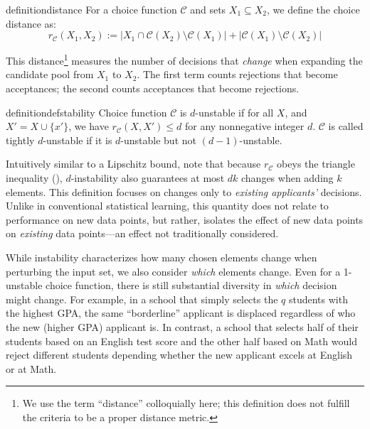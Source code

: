 \documentclass[letterpaper]{article}
\newcommand{\choice}{\mathcal{C}}
\begin{document}
\begin{restatable}{definition}{distance} \label{def:distance}
For a choice function $\choice$ and sets $X_1 \subseteq X_2$, we define the choice distance as:
\begin{equation}
r_\choice(X_1, X_2) := |X_1 \cap \choice(X_2) \setminus \choice(X_1)| + |\choice(X_1) \setminus \choice(X_2)|
\end{equation}
\end{restatable}

This distance\footnote{We use the term ``distance'' colloquially here; this definition does not fulfill the criteria to be a proper distance metric.} measures the number of decisions that \textit{change} when expanding the candidate pool from $X_1$ to $X_2$. The first term counts rejections that become acceptances; the second counts acceptances that become rejections.

\begin{restatable}[$d$-Instability]{definition}{defstability}
\label{def:d-instability}
Choice function $\choice$ is $d$-unstable if for all $X$, and $X' = X \cup \{x'\}$, we have $r_\choice(X, X') \leq d$ for any nonnegative integer $d$. $\choice$ is called tightly $d$-unstable if it is $d$-unstable but not $(d-1)$-unstable.
\end{restatable}

Intuitively similar to a Lipschitz bound, note that because $r_\choice$ obeys the triangle inequality (), $d$-instability also guarantees at most $dk$ changes when adding $k$ elements.
This definition focuses on changes only to \textit{existing applicants'} decisions. Unlike in conventional statistical learning, this quantity does not relate to performance on new data points, but rather, isolates the effect of new data points on \textit{existing} data points---an effect not traditionally considered.

While instability characterizes how many chosen elements change when perturbing the input set, we also consider \textit{which} elements change.
Even for a 1-unstable choice function, there is still substantial diversity in \textit{which} decision might change.
For example, in a school that simply selects the $q$ students with the highest GPA, the same ``borderline'' applicant is displaced regardless of who the new (higher GPA) applicant is.
In contrast, a school that selects half of their students based on an English test score and the other half based on Math would reject different students depending whether the new applicant excels at English or at Math.
\end{document}
